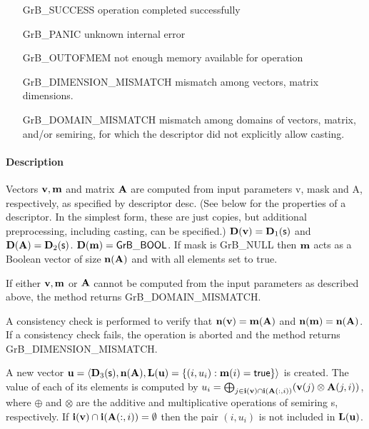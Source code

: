 
\begin{itemize}[leftmargin=2.1in]
\item[{\sf GrB\_SUCCESS}]             operation completed successfully
\item[{\sf GrB\_PANIC}]               unknown internal error
\item[{\sf GrB\_OUTOFMEM}]            not enough memory available for operation
\item[{\sf GrB\_DIMENSION\_MISMATCH}] mismatch among vectors, matrix dimensions.
\item[{\sf GrB\_DOMAIN\_MISMATCH}]    mismatch among domains of vectors, matrix, and/or semiring, for which the descriptor did not explicitly allow casting.
\end{itemize}

\paragraph{Description}

Vectors ${\bf v}, {\bf m}$ and matrix ${\bf A}$ are computed from
input parameters {\sf v}, {\sf mask} and {\sf A}, respectively, as specified
by descriptor {\sf desc}. (See below for the properties of a descriptor. In
the simplest form, these are just copies, but additional preprocessing,
including casting, can be specified.)  $\bold{D}({\bf v}) =
\bold{D}_1({\sf s})$ and $\bold{D}({\bf A}) = \bold{D}_2({\sf s})$.
$\bold{D}({\bf m}) = {\sf GrB\_BOOL}$.  If {\sf mask} is {\sf GrB\_NULL}
then ${\bf m}$ acts as a Boolean vector of size $\bold{n}({\bf A})$
and with all elements set to {\sf true}.

If either ${\bf v}, {\bf m}$ or ${\bf A}$ cannot be computed
from the input parameters as described above, the method returns {\sf
GrB\_DOMAIN\_MISMATCH}.

A consistency check is performed to verify that $\bold{n}({\bf v})
= \bold{m}({\bf A})$ and $\bold{n}({\bf m}) =
\bold{n}({\bf A})$. If a consistency check fails, the operation is
aborted and the method returns {\sf GrB\_DIMENSION\_MISMATCH}.

A new vector ${\bf u} = \langle \bold{D}_3({\sf s}),
\bold{n}({\bf A}), \bold{L}({\bf u}) = \{(i,u_i) : {\bf m}(i)
= {\sf true} \} \rangle$ is created.  The value of each of its elements
is computed by $u_i = \bigoplus_{j \in {\bf i}({\bf v}) \cap
{\bf i}({\bf A}(:,i))} ({\bf v}(j) \otimes {\bf A}(j,i))$,
where $\oplus$ and $\otimes$ are the additive and multiplicative
operations of semiring {\sf s}, respectively.  If ${\bf i}({\bf v})
\cap {\bf i}({\bf A}(:,i)) = \emptyset$ then the pair $(i,u_i)$
is not included in $\bold{L}({\bf u})$.

